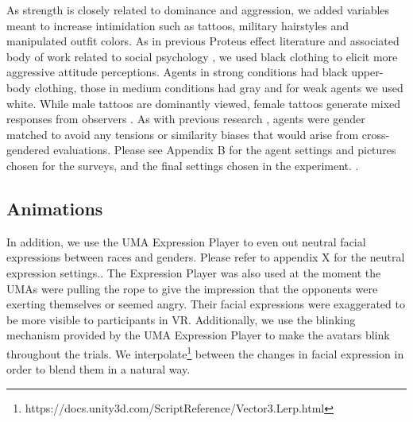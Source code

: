 As strength is closely related to dominance and aggression, we added variables meant to increase intimidation such as tattoos, military hairstyles and manipulated outfit colors. As in previous Proteus effect literature and associated body of work related to social psychology \cite{yee2009proteus,pena2009priming}, we used black clothing to elicit more aggressive attitude perceptions. Agents in strong conditions had black upper-body clothing, those in medium conditions had gray and for weak agents we used white. While male tattoos are dominantly viewed, female tattoos generate mixed responses from observers \cite{wohlrab2009perception}. As with previous research \cite{van2013proteus}, agents were gender matched to avoid any tensions or similarity biases that would arise from cross-gendered evaluations. Please see Appendix B for the agent settings and pictures chosen for the surveys, and the final settings chosen in the experiment. .

\subsection{Animations}
\label{subsection:animation}
 In addition, we use the UMA Expression Player to even out neutral facial expressions between races and genders. Please refer to appendix X for the neutral expression settings.. The Expression Player was also used at the moment the UMAs were pulling the rope to give the impression that the opponents were exerting themselves or seemed angry. Their facial expressions were exaggerated to be more visible to participants in VR. Additionally, we use the blinking mechanism provided by the UMA Expression Player to make the avatars blink throughout the trials. We interpolate\footnote{https://docs.unity3d.com/ScriptReference/Vector3.Lerp.html} between the changes in facial expression in order to blend them in a natural way.
 
